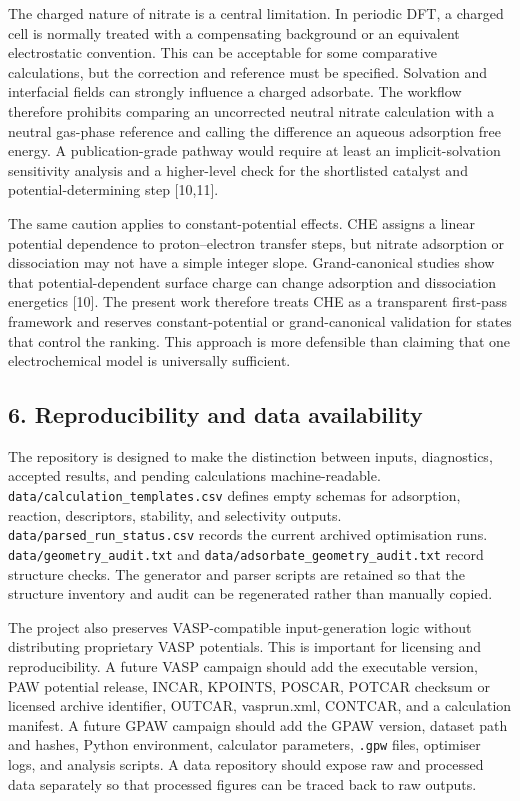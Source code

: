 \documentclass[
]{article}
\begin{document}
The charged nature of nitrate is a central limitation. In periodic DFT,
a charged cell is normally treated with a compensating background or an
equivalent electrostatic convention. This can be acceptable for some
comparative calculations, but the correction and reference must be
specified. Solvation and interfacial fields can strongly influence a
charged adsorbate. The workflow therefore prohibits comparing an
uncorrected neutral nitrate calculation with a neutral gas-phase
reference and calling the difference an aqueous adsorption free energy.
A publication-grade pathway would require at least an implicit-solvation
sensitivity analysis and a higher-level check for the shortlisted
catalyst and potential-determining step {[}10,11{]}.

The same caution applies to constant-potential effects. CHE assigns a
linear potential dependence to proton--electron transfer steps, but
nitrate adsorption or dissociation may not have a simple integer slope.
Grand-canonical studies show that potential-dependent surface charge can
change adsorption and dissociation energetics {[}10{]}. The present work
therefore treats CHE as a transparent first-pass framework and reserves
constant-potential or grand-canonical validation for states that control
the ranking. This approach is more defensible than claiming that one
electrochemical model is universally sufficient.

\hypertarget{reproducibility-and-data-availability}{%
\subsection{6. Reproducibility and data
availability}\label{reproducibility-and-data-availability}}

The repository is designed to make the distinction between inputs,
diagnostics, accepted results, and pending calculations
machine-readable. \texttt{data/calculation\_templates.csv} defines empty
schemas for adsorption, reaction, descriptors, stability, and
selectivity outputs. \texttt{data/parsed\_run\_status.csv} records the
current archived optimisation runs. \texttt{data/geometry\_audit.txt}
and \texttt{data/adsorbate\_geometry\_audit.txt} record structure
checks. The generator and parser scripts are retained so that the
structure inventory and audit can be regenerated rather than manually
copied.

The project also preserves VASP-compatible input-generation logic
without distributing proprietary VASP potentials. This is important for
licensing and reproducibility. A future VASP campaign should add the
executable version, PAW potential release, INCAR, KPOINTS, POSCAR,
POTCAR checksum or licensed archive identifier, OUTCAR, vasprun.xml,
CONTCAR, and a calculation manifest. A future GPAW campaign should add
the GPAW version, dataset path and hashes, Python environment,
calculator parameters, \texttt{.gpw} files, optimiser logs, and analysis
scripts. A data repository should expose raw and processed data
separately so that processed figures can be traced back to raw outputs.
\end{document}
